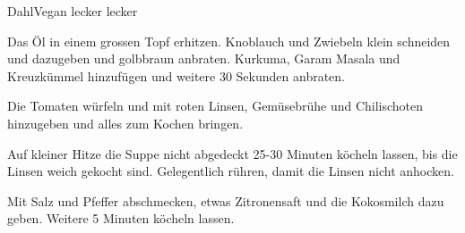 
\begin{recipe}[]{Dahl}{Vegan lecker lecker}{}



\step
Das \"Ol in einem grossen Topf erhitzen. Knoblauch und Zwiebeln klein schneiden und dazugeben und golbbraun anbraten. Kurkuma, Garam Masala und Kreuzk\"ummel hinzuf\"ugen und weitere 30 Sekunden anbraten.

\step
Die Tomaten w\"urfeln und mit roten Linsen, Gem\"usebr\"uhe und Chilischoten hinzugeben und alles zum Kochen bringen.


\step
Auf kleiner Hitze die Suppe nicht abgedeckt 25-30 Minuten k\"ocheln lassen, bis die Linsen weich gekocht sind.
Gelegentlich r\"uhren, damit die Linsen nicht anhocken.

\step
Mit Salz und Pfeffer abschmecken, etwas Zitronensaft und die Kokosmilch dazu geben. Weitere 5 Minuten k\"ocheln lassen.


\end{recipe}
